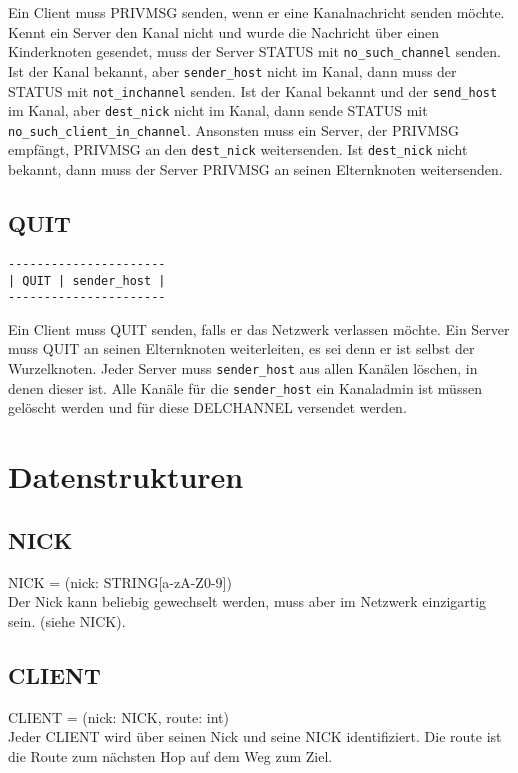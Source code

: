 \documentclass{article}
\begin{document}
Ein Client muss PRIVMSG senden, wenn er eine Kanalnachricht senden möchte.
Kennt ein Server den Kanal nicht und wurde die Nachricht über einen Kinderknoten gesendet, muss der Server STATUS mit \lstinline{no_such_channel} senden.
Ist der Kanal bekannt, aber \lstinline{sender_host} nicht im Kanal, dann muss der STATUS mit \lstinline{not_inchannel} senden.
Ist der Kanal bekannt und der \lstinline{send_host} im Kanal, aber \lstinline{dest_nick} nicht im Kanal, dann sende STATUS mit \lstinline{no_such_client_in_channel}.
Ansonsten muss ein Server, der PRIVMSG empfängt, PRIVMSG an den \lstinline{dest_nick} weitersenden.
Ist \lstinline{dest_nick} nicht bekannt, dann muss der Server PRIVMSG an seinen Elternknoten weitersenden.

\subsection{QUIT}

\begin{lstlisting}
----------------------
| QUIT | sender_host |
----------------------
\end{lstlisting}

Ein Client muss QUIT senden, falls er das Netzwerk verlassen möchte.
Ein Server muss QUIT an seinen Elternknoten weiterleiten, es sei denn er ist selbst der Wurzelknoten.
Jeder Server muss \lstinline{sender_host} aus allen Kanälen löschen, in denen dieser ist.
Alle Kanäle für die \lstinline{sender_host} ein Kanaladmin ist müssen gelöscht werden und für diese DELCHANNEL versendet werden.

\section{Datenstrukturen}

\subsection{NICK}

NICK = (nick: STRING[a-zA-Z0-9])\\
Der Nick kann beliebig gewechselt werden, muss aber im Netzwerk einzigartig sein. (siehe NICK).

\subsection{CLIENT}

CLIENT = (nick: NICK, route: int)\\
Jeder CLIENT wird über seinen Nick und seine NICK identifiziert. Die route ist die Route zum nächsten Hop auf dem Weg zum Ziel.
\end{document}

